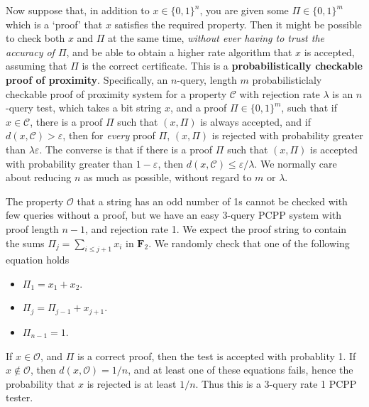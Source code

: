 Now suppose that, in addition to $x \in \{ 0, 1 \}^n$, you are given some $\Pi \in \{ 0, 1 \}^m$ which is a `proof' that $x$ satisfies the required property. Then it might be possible to check both $x$ and $\Pi$ at the same time, {\it without ever having to trust the accuracy of $\Pi$}, and be able to obtain a higher rate algorithm that $x$ is accepted, assuming that $\Pi$ is the correct certificate. This is a {\bf probabilistically checkable proof of proximity}. Specifically, an $n$-query, length $m$ probabilisticlaly checkable proof of proximity system for a property $\mathcal{C}$ with rejection rate $\lambda$ is an $n$-query test, which takes a bit string $x$, and a proof $\Pi \in \{ 0, 1 \}^m$, such that if $x \in \mathcal{C}$, there is a proof $\Pi$ such that $(x,\Pi)$ is always accepted, and if $d(x,\mathcal{C}) > \varepsilon$, then for {\it every} proof $\Pi$, $(x,\Pi)$ is rejected with probability greater than $\lambda \varepsilon$. The converse is that if there is a proof $\Pi$ such that $(x,\Pi)$ is accepted with probability greater than $1 - \varepsilon$, then $d(x,\mathcal{C}) \leq \varepsilon/\lambda$. We normally care about reducing $n$ as much as possible, without regard to $m$ or $\lambda$.

\begin{example}
    The property $\mathcal{O}$ that a string has an odd number of 1s cannot be checked with few queries without a proof, but we have an easy 3-query PCPP system with proof length $n-1$, and rejection rate 1. We expect the proof string to contain the sums $\Pi_j = \sum_{i \leq j+1} x_i$ in $\mathbf{F}_2$. We randomly check that one of the following equation holds
    \begin{itemize}
        \item $\Pi_1 = x_1 + x_2$.
        \item $\Pi_j = \Pi_{j-1} + x_{j+1}$.
        \item $\Pi_{n-1} = 1$.
    \end{itemize}
    If $x \in \mathcal{O}$, and $\Pi$ is a correct proof, then the test is accepted with probablity 1. If $x \not \in \mathcal{O}$, then $d(x,\mathcal{O}) = 1/n$, and at least one of these equations fails, hence the probability that $x$ is rejected is at least $1/n$. Thus this is a 3-query rate 1 PCPP tester.
\end{example}

